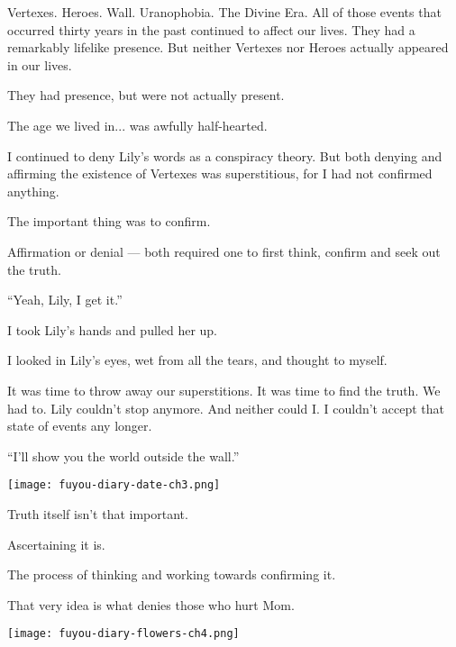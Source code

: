 Vertexes. Heroes. Wall. Uranophobia. The Divine Era. All of those events that occurred thirty years in the past continued to affect our lives. They had a remarkably lifelike presence. But neither Vertexes nor Heroes actually appeared in our lives.

They had presence, but were not actually present.

The age we lived in... was awfully half-hearted.

I continued to deny Lily's words as a conspiracy theory. But both denying and affirming the existence of Vertexes was superstitious, for I had not confirmed anything.

The important thing was to confirm.

Affirmation or denial --- both required one to first think, confirm and seek out the truth.

``Yeah, Lily, I get it.''

I took Lily's hands and pulled her up.

I looked in Lily's eyes, wet from all the tears, and thought to myself.

It was time to throw away our superstitions. It was time to find the truth. We had to. Lily couldn't stop anymore. And neither could I. I couldn't accept that state of events any longer.

``I'll show you the world outside the wall.''


\begin{center}
\begin{graphpaperBox}[enhanced,box align=center,colframe=diaryborder,width=0.8\textwidth]

\hspace*{-5mm}\texttt{[image: fuyou-diary-date-ch3.png]}


Truth itself isn't that important.

Ascertaining it is.

The process of thinking and working towards confirming it.

That very idea is what denies those who hurt Mom.

\texttt{[image: fuyou-diary-flowers-ch4.png]}

\end{graphpaperBox}
\end{center}
